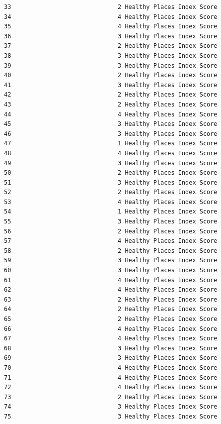 \documentclass[
  letterpaper,
  DIV=11,
  numbers=noendperiod]{scrartcl}
\begin{document}
\begin{verbatim}
33                              2 Healthy Places Index Score
34                              4 Healthy Places Index Score
35                              4 Healthy Places Index Score
36                              3 Healthy Places Index Score
37                              2 Healthy Places Index Score
38                              3 Healthy Places Index Score
39                              3 Healthy Places Index Score
40                              2 Healthy Places Index Score
41                              3 Healthy Places Index Score
42                              2 Healthy Places Index Score
43                              2 Healthy Places Index Score
44                              4 Healthy Places Index Score
45                              3 Healthy Places Index Score
46                              3 Healthy Places Index Score
47                              1 Healthy Places Index Score
48                              4 Healthy Places Index Score
49                              3 Healthy Places Index Score
50                              2 Healthy Places Index Score
51                              3 Healthy Places Index Score
52                              2 Healthy Places Index Score
53                              4 Healthy Places Index Score
54                              1 Healthy Places Index Score
55                              3 Healthy Places Index Score
56                              2 Healthy Places Index Score
57                              4 Healthy Places Index Score
58                              2 Healthy Places Index Score
59                              3 Healthy Places Index Score
60                              3 Healthy Places Index Score
61                              4 Healthy Places Index Score
62                              4 Healthy Places Index Score
63                              2 Healthy Places Index Score
64                              2 Healthy Places Index Score
65                              2 Healthy Places Index Score
66                              4 Healthy Places Index Score
67                              4 Healthy Places Index Score
68                              3 Healthy Places Index Score
69                              3 Healthy Places Index Score
70                              4 Healthy Places Index Score
71                              4 Healthy Places Index Score
72                              4 Healthy Places Index Score
73                              2 Healthy Places Index Score
74                              3 Healthy Places Index Score
75                              3 Healthy Places Index Score

\end{verbatim}
\end{document}
